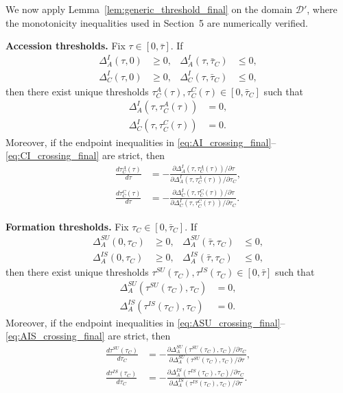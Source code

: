 We now apply Lemma~\ref{lem:generic_threshold_final} on the domain
$\mathcal D'$, where the monotonicity inequalities used in Section~5 are
numerically verified.

\noindent\textbf{Accession thresholds.}
Fix $\tau\in[0,\bar\tau]$. If
\begin{align}
\Delta_A^I(\tau,0) &\ge 0, &
\Delta_A^I(\tau,\bar\tau_C) &\le 0, \label{eq:AI_crossing_final}\\
\Delta_C^I(\tau,0) &\ge 0, &
\Delta_C^I(\tau,\bar\tau_C) &\le 0, \label{eq:CI_crossing_final}
\end{align}
then there exist unique thresholds $\tau_C^A(\tau),\tau_C^C(\tau)\in[0,\bar\tau_C]$
such that
\begin{align}
\Delta_A^I(\tau,\tau_C^A(\tau)) &= 0, \label{eq:tauCA_final}\\
\Delta_C^I(\tau,\tau_C^C(\tau)) &= 0. \label{eq:tauCC_final}
\end{align}
Moreover, if the endpoint inequalities in
\eqref{eq:AI_crossing_final}--\eqref{eq:CI_crossing_final} are strict, then
\begin{align}
\frac{d\tau_C^A(\tau)}{d\tau}
&=
-\frac{\partial \Delta_A^I(\tau,\tau_C^A(\tau))/\partial \tau}
{\partial \Delta_A^I(\tau,\tau_C^A(\tau))/\partial \tau_C},
\label{eq:d_tauCA_final}
\\
\frac{d\tau_C^C(\tau)}{d\tau}
&=
-\frac{\partial \Delta_C^I(\tau,\tau_C^C(\tau))/\partial \tau}
{\partial \Delta_C^I(\tau,\tau_C^C(\tau))/\partial \tau_C}.
\label{eq:d_tauCC_final}
\end{align}

\medskip
\noindent\textbf{Formation thresholds.}
Fix $\tau_C\in[0,\bar\tau_C]$. If
\begin{align}
\Delta_A^{SU}(0,\tau_C) &\ge 0, &
\Delta_A^{SU}(\bar\tau,\tau_C) &\le 0, \label{eq:ASU_crossing_final}\\
\Delta_A^{IS}(0,\tau_C) &\ge 0, &
\Delta_A^{IS}(\bar\tau,\tau_C) &\le 0, \label{eq:AIS_crossing_final}
\end{align}
then there exist unique thresholds $\tau^{SU}(\tau_C),\tau^{IS}(\tau_C)\in[0,\bar\tau]$
such that
\begin{align}
\Delta_A^{SU}(\tau^{SU}(\tau_C),\tau_C) &= 0, \label{eq:tauSU_final}\\
\Delta_A^{IS}(\tau^{IS}(\tau_C),\tau_C) &= 0. \label{eq:tauIS_final}
\end{align}
Moreover, if the endpoint inequalities in
\eqref{eq:ASU_crossing_final}--\eqref{eq:AIS_crossing_final} are strict, then
\begin{align}
\frac{d\tau^{SU}(\tau_C)}{d\tau_C}
&=
-\frac{\partial \Delta_A^{SU}(\tau^{SU}(\tau_C),\tau_C)/\partial \tau_C}
{\partial \Delta_A^{SU}(\tau^{SU}(\tau_C),\tau_C)/\partial \tau},
\label{eq:d_tauSU_final}
\\
\frac{d\tau^{IS}(\tau_C)}{d\tau_C}
&=
-\frac{\partial \Delta_A^{IS}(\tau^{IS}(\tau_C),\tau_C)/\partial \tau_C}
{\partial \Delta_A^{IS}(\tau^{IS}(\tau_C),\tau_C)/\partial \tau}.
\label{eq:d_tauIS_final}
\end{align}

